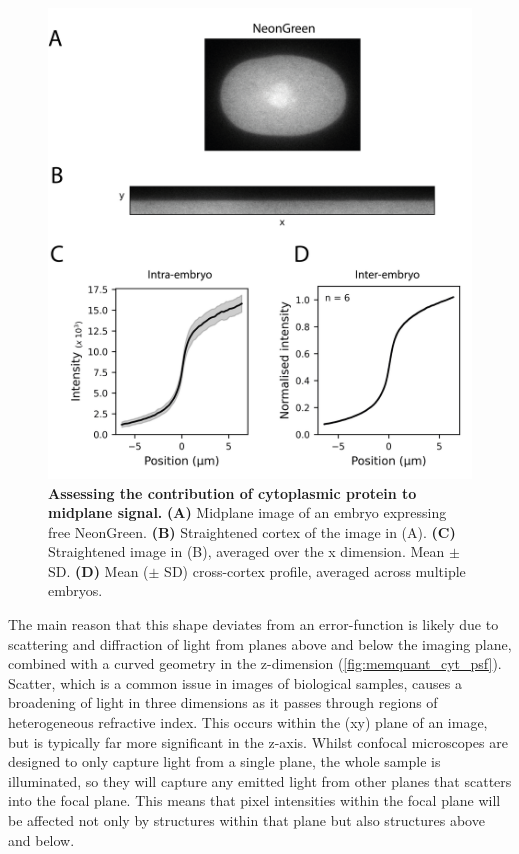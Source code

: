 \documentclass[12pt]{"report"}
\newcommand{\mycaption}[2]{\caption[#1]{\textbf{#1.} #2}}
\begin{document}
\begin{figure}
\includegraphics[scale=1]{memquant_cyt_profile}
\centering
\mycaption{Assessing the contribution of cytoplasmic protein to midplane signal}{
\textbf{(A)} Midplane image of an embryo expressing free NeonGreen.
\textbf{(B)} Straightened cortex of the image in (A).
\textbf{(C)} Straightened image in (B), averaged over the x dimension. Mean $\pm$ SD.
\textbf{(D)} Mean ($\pm$ SD) cross-cortex profile, averaged across multiple embryos.
}
\label{fig:memquant_cyt_profile}
\end{figure}

The main reason that this shape deviates from an error-function is likely due to scattering and diffraction of light from planes above and below the imaging plane, combined with a curved geometry in the z-dimension (\cref{fig:memquant_cyt_psf}). Scatter, which is a common issue in images of biological samples, causes a broadening of light in three dimensions as it passes through regions of heterogeneous refractive index. This occurs within the (xy) plane of an image, but is typically far more significant in the z-axis. Whilst confocal microscopes are designed to only capture light from a single plane, the whole sample is illuminated, so they will capture any emitted light from other planes that scatters into the focal plane. This means that pixel intensities within the focal plane will be affected not only by structures within that plane but also structures above and below.\\
\end{document}
